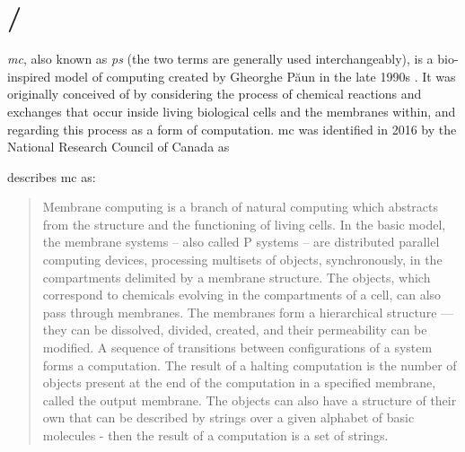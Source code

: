 \section{\label{sec:back:mc}/}

\emph{\Gls{mc}}, also known as \emph{\gls{ps}} (the two terms are generally used interchangeably), is a bio-inspired model of computing created by Gheorghe Păun in the late 1990s \cite{tPaun98a,Paun2000}.  It was originally conceived of by considering the process of chemical reactions and exchanges that occur inside living biological cells and the membranes within, and regarding this process as a form of computation.  \Gls{mc} was identified in 2016 by the National Research Council of Canada as 

\citeauthor{Paun2002} describes \gls{mc} as:
\blockcquote[][p.~VII]{Paun2002}{Membrane computing is a branch of natural computing which abstracts from the structure and the functioning of living cells. In the basic model, the membrane systems -- also called P systems -- are distributed parallel computing devices, processing multisets of objects, synchronously, in the compartments delimited by a membrane structure. The objects, which correspond to chemicals evolving in the compartments of a cell, can also pass through membranes. The membranes form a hierarchical structure --- they can be dissolved, divided, created, and their permeability can be modified. A sequence of transitions between configurations of a system forms a computation. The result of a halting computation is the number of objects present at the end of the computation in a specified membrane, called the output membrane. The objects can also have a structure of their own that can be described by strings over a given alphabet of basic molecules - then the result of a computation is a set of strings.}

